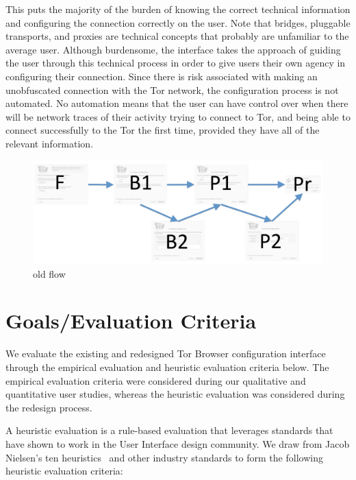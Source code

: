 \documentclass[USenglish,oneside,twocolumn]{article}
\begin{document}
This puts the majority of the burden of knowing the correct technical information and configuring the connection correctly on the user. Note that bridges, pluggable transports, and proxies are technical concepts that probably are unfamiliar to the average user. Although burdensome, the interface takes the approach of guiding the user through this technical process in order to give users their own agency in configuring their connection. Since there is risk associated with making an unobfuscated connection with the Tor network, the configuration process is not automated. No automation means that the user can have control over when there will be network traces of their activity trying to connect to Tor, and being able to connect successfully to the Tor the first time, provided they have all of the relevant information. 

\begin{figure}[t]
	\centering
		\includegraphics[width=1.0\textwidth]{old-flow.pdf} 
		\caption{old flow} 
	\label{fig:old-flow}
\end{figure} 

\section{Goals/Evaluation Criteria}
\label{sec:goals}
We evaluate the existing and redesigned Tor Browser configuration interface 
through the empirical evaluation and heuristic evaluation criteria below. The
empirical evaluation criteria were considered during our qualitative and 
quantitative user studies, whereas the heuristic evaluation was considered during
the redesign process. 

A heuristic evaluation is a rule-based evaluation that leverages standards
that have shown to work in the User Interface design 
community. We draw from Jacob Nielsen's ten heuristics~\cite{nielsen1994heuristic}
and other industry standards to form the following heuristic evaluation criteria: \\
\end{document}
